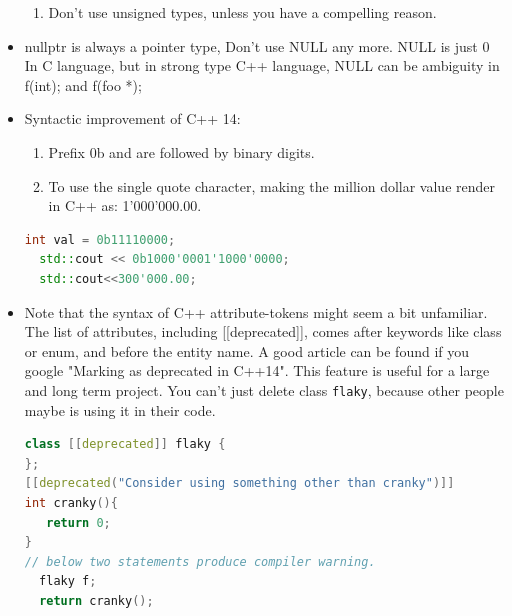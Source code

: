 \documentclass[a4paper,11pt,twoside]{book}
\begin{document}
\begin{itemize}
\begin{enumerate}
	\item Don't use unsigned types, unless you have a compelling reason.
\end{enumerate}





\item nullptr is always a pointer type, Don't use NULL any more. NULL is just 0 In C language, but in strong type C++ language, NULL can be ambiguity in f(int); and f(foo *);

\item Syntactic improvement of C++ 14:
\begin{enumerate}
\item Prefix 0b and are followed by binary digits.
\item To use the single quote character, making the million dollar value render in C++ as: 1'000'000.00.
\end{enumerate}

\begin{lstlisting}[frame=single, language=c++]
  int val = 0b11110000;
  std::cout << 0b1000'0001'1000'0000;
  std::cout<<300'000.00;
\end{lstlisting}

\item Note that the syntax of C++ attribute-tokens might seem a bit unfamiliar. The list of attributes, including [[deprecated]], comes after keywords like class or enum, and before the entity name. A good article can be found if you google "Marking as deprecated in C++14". This feature is useful for a large and long term project. You can't just delete class \texttt{flaky}, because other people maybe is using it in their code. 

\begin{lstlisting}[frame=single, language=c++]
class [[deprecated]] flaky {
};
[[deprecated("Consider using something other than cranky")]]
int cranky(){
   return 0;
}
// below two statements produce compiler warning.
  flaky f;
  return cranky();
\end{lstlisting}

\end{itemize}
\end{document}
